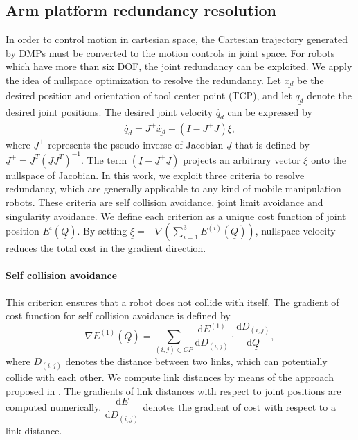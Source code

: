 \subsection{Arm platform redundancy resolution}
In order to control motion in cartesian space, the Cartesian trajectory generated by DMPs must be converted to the motion controls in joint space. For robots which have more than six DOF,  the joint redundancy can be exploited. We apply the idea of nullspace optimization \cite{Nakanishi2005} to resolve the redundancy. Let $\underline{{x}_d}$ be the desired position and orientation of tool center point (TCP), and let $\underline{q_d}$ denote the desired joint positions. The desired joint velocity $\dot{\underline{q_d}}$ can be expressed by 
\begin{equation}
 \dot{\underline{q_d}} = \underline{J}^+ \dot{\underline{x_d}} + (\underline{I} - \underline{J}^+  \underline{J} )\underline{\xi},
\end{equation}
where $\underline{J}^+$ represents the pseudo-inverse of Jacobian $\underline{J}$  that is defined by $\underline{J}^+ = \underline{J}^T(\underline{J}\underline{J}^T)^{-1} $. The term $(\underline{I} - \underline{J}^+  \underline{J} )$ projects an arbitrary vector $\underline{\xi}$ onto the nullspace of Jacobian. In this work, we exploit three criteria to resolve redundancy, which are generally applicable to any kind of mobile manipulation robots. These criteria are self collision avoidance, joint limit avoidance and singularity avoidance. We define each criterion as a unique cost function of joint position ${E}^i(\underline{Q})$. By setting $\underline{\xi} = -\nabla(\sum\limits_{i=1}^3 {E}^{(i)}(\underline{Q}))$, nullspace velocity reduces the total cost in the gradient direction.

\paragraph{Self collision avoidance} This criterion ensures that a robot does not collide with itself. The gradient of cost function for self collision avoidance is defined by 
\begin{equation}
\label{equ:criterion1}
\nabla E^{(1)}(\underline{Q}) = \sum\limits_{(i,j)\in CP} \dfrac{ \text{d}E^{(1)}}{\text {d}D_{(i,j)}} \cdot \dfrac{\text{d}D_{(i,j)}}{\text{d}\underline{Q}},
\end{equation}
where $D_{(i,j)}$ denotes the distance between two links, which can potentially collide with each other. We compute link distances by means of the approach proposed in \cite{Larsen1999}. The gradients of link distances with respect to joint positions are computed numerically. $\dfrac{ \text{d}E}{\text {d}D_{(i,j)}}$ denotes the gradient of cost with respect to a link distance.   

